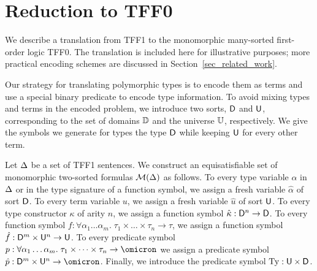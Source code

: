 \section{Reduction to TFF0} \label{sec:trans}

We describe a translation from TFF1 to the monomorphic many-sorted first-order
logic TFF0. The translation is included here for illustrative purposes; more
practical encoding schemes are discussed in Section~\ref{sec_related_work}.

Our strategy for translating polymorphic types is to encode them as terms and
use a special binary predicate to encode type information. To avoid mixing types
and terms in the encoded problem, we introduce two sorts, $\mathsf{D}$ and $\mathsf{U}$,
corresponding to the set of domains $\mathbb{D}$ and the universe $\mathbb{U}$,
respectively. We give the symbols we generate for types the type $\mathsf{D}$ while
keeping $\mathsf{U}$ for every other term.

Let $\mathrm{\Delta}$ be a set of TFF1 sentences.
We construct an equisatisfiable set of monomorphic two-sorted
formulas $\mathcal{M}(\mathrm{\Delta})$ as follows.
%
To every type variable $\alpha$ in $\mathrm{\Delta}$ or in the type signature of a function
symbol, we assign a fresh variable $\hat{\alpha}$ of sort $\mathsf{D}$.
To every term variable $u$, we assign
a fresh variable $\hat{u}$ of sort $\mathsf{U}$.
To every type constructor $\kappa$ of arity $n$, we assign
a function symbol $\hat{\kappa} : \mathsf{D}^n \to \mathsf{D}$.
To every function symbol $f : \forall \alpha_1\dots\alpha_m .\; \tau_1 \times \dots \times \tau_n \to \tau$,
we assign a function symbol $\hat{f} : \mathsf{D}^m \times \mathsf{U}^n \to \mathsf{U}$.
To every predicate symbol $p : \forall \alpha_1\dots\alpha_m .\; \tau_1 \times \dots \times \tau_n \to \omicron$
we assign a predicate symbol $\hat{p} : \typ^m \times \und^n \to \omicron$.
Finally, we introduce the predicate symbol $\mathrm{Ty} : \mathsf{U} \times \mathsf{D}$.

